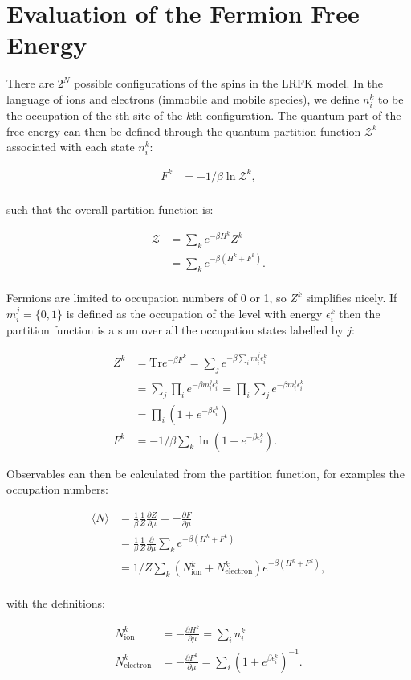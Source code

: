 \hypertarget{evaluation-of-the-fermion-free-energy}{%
\section{Evaluation of the Fermion Free Energy}\label{evaluation-of-the-fermion-free-energy}}

There are \(2^N\) possible configurations of the spins in the LRFK model. In the language of ions and electrons (immobile and mobile species), we define \(n^k_i\) to be the occupation of the \(i\)th site of the \(k\)th configuration. The quantum part of the free energy can then be defined through the quantum partition function \(\mathcal{Z}^k\) associated with each state \(n^k_i\):

\[\begin{aligned}
F^k &= -1/\beta \ln{\mathcal{Z}^k}, \\
\end{aligned}\]

such that the overall partition function is:

\[\begin{aligned}
\mathcal{Z} &= \sum_k e^{- \beta H^k} Z^k \\
&= \sum_k e^{-\beta (H^k + F^k)}. \\
\end{aligned}\]

Fermions are limited to occupation numbers of 0 or 1, so \(Z^k\) simplifies nicely. If \(m^j_i = \{0,1\}\) is defined as the occupation of the level with energy \(\epsilon^k_i\) then the partition function is a sum over all the occupation states labelled by \(j\):

\[\begin{aligned}
Z^k    &= \mathrm{Tr} e^{-\beta F^k} = \sum_j e^{-\beta \sum_i m^j_i \epsilon^k_i}\\
       &= \sum_j \prod_i e^{- \beta m^j_i \epsilon^k_i}= \prod_i \sum_j e^{- \beta m^j_i \epsilon^k_i}\\
       &= \prod_i (1 + e^{- \beta \epsilon^k_i})\\
F^k    &= -1/\beta \sum_k \ln{(1 + e^{- \beta \epsilon^k_i})}.
\end{aligned}\]

Observables can then be calculated from the partition function, for examples the occupation numbers:

\[\begin{aligned}
\langle N \rangle &= \frac{1}{\beta} \frac{1}{Z} \frac{\partial Z}{\partial \mu} = - \frac{\partial F}{\partial \mu}\\
    &= \frac{1}{\beta} \frac{1}{Z} \frac{\partial}{\partial \mu} \sum_k e^{-\beta (H^k + F^k)}\\
    &= 1/Z \sum_k (N^k_{\mathrm{ion}} + N^k_{\mathrm{electron}}) e^{-\beta (H^k + F^k)},\\
\end{aligned}\]

with the definitions:

\[\begin{aligned}
N^k_{\mathrm{ion}} &= - \frac{\partial H^k}{\partial \mu} = \sum_i n^k_i\\
N^k_{\mathrm{electron}} &= - \frac{\partial F^k}{\partial \mu} = \sum_i \left(1 + e^{\beta \epsilon^k_i}\right)^{-1}.\\
\end{aligned}\]
